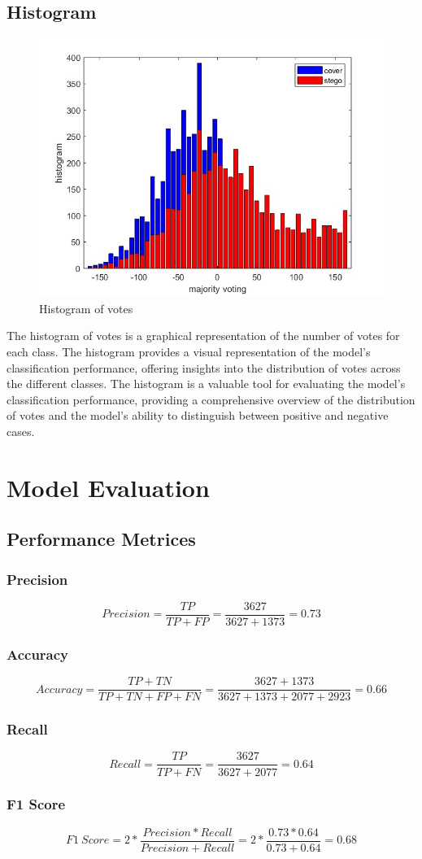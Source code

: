 \subsection{Histogram}
\begin{figure}[H]
    \centering
    \includegraphics[width=120mm]{./img/2600/histo2600.jpg}
    \caption{Histogram of votes}
\end{figure}
The histogram of votes is a graphical representation of the number of votes for each class. The histogram provides a visual representation of the model's classification performance, offering insights into the distribution of votes across the different classes. The histogram is a valuable tool for evaluating the model's classification performance, providing a comprehensive overview of the distribution of votes and the model's ability to distinguish between positive and negative cases.
\clearpage
\section{Model Evaluation}
\subsection{Performance Metrices}
\subsubsection{Precision}
\normalsize{
$$Precision = \frac{TP}{TP+FP} = \frac{3627}{3627+1373} = 0.73 $$
\subsubsection{Accuracy}
$$Accuracy = \frac{TP+TN}{TP+TN+FP+FN}= \frac{3627+1373}{3627+1373+2077+2923}=0.66$$
\subsubsection{Recall}
$$Recall = \frac{TP}{TP+FN} = \frac{3627}{3627+2077}= 0.64$$
\subsubsection{F1 Score}
$$F1\ Score = 2*\frac{Precision*Recall}{Precision+Recall} = 2*\frac{0.73*0.64}{0.73+0.64} = 0.68$$
}






